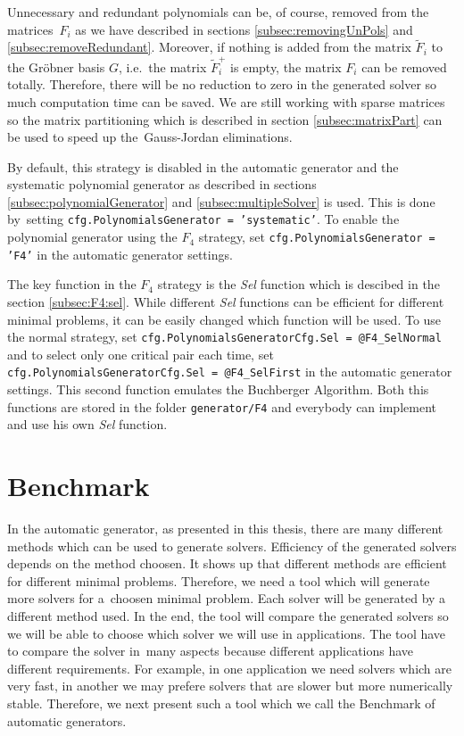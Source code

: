 Unnecessary and redundant polynomials can be, of course, removed from the matrices~$F_i$ as we have described in sections \ref{subsec:removingUnPols} and \ref{subsec:removeRedundant}. Moreover, if nothing is added from the matrix $\tilde{F}_i$ to the Gr\"obner basis $G$, i.e.\ the matrix $\tilde{F}_i^+$ is empty, the matrix $F_i$ can be removed totally. Therefore, there will be no reduction to zero in the generated solver so much computation time can be saved. We are still working with sparse matrices so the matrix partitioning which is described in section \ref{subsec:matrixPart} can be used to speed up the~Gauss-Jordan eliminations.

By default, this strategy is disabled in the automatic generator and the systematic polynomial generator as described in sections \ref{subsec:polynomialGenerator} and \ref{subsec:multipleSolver} is used. This is done by~setting \texttt{cfg.PolynomialsGenerator = 'systematic'}. To enable the polynomial generator using the $F_4$ strategy, set \texttt{cfg.PolynomialsGenerator = 'F4'} in the automatic generator settings.

The key function in the $F_4$ strategy is the \textit{Sel} function which is descibed in the section \ref{subsec:F4:sel}. While different \textit{Sel} functions can be efficient for different minimal problems, it can be easily changed which function will be used. To use the normal strategy, set \texttt{cfg.PolynomialsGeneratorCfg.Sel = @F4\_SelNormal} and to select only one critical pair each time, set \texttt{cfg.PolynomialsGeneratorCfg.Sel = @F4\_SelFirst} in the automatic generator settings. This second function emulates the Buchberger Algorithm. Both this functions are stored in the folder \texttt{generator/F4} and everybody can implement and use his own \textit{Sel} function.

\section{Benchmark}
In the automatic generator, as presented in this thesis, there are many different methods which can be used to generate solvers. Efficiency of the generated solvers depends on the method choosen. It shows up that different methods are efficient for different minimal problems. Therefore, we need a tool which will generate more solvers for a~choosen minimal problem. Each solver will be generated by a different method used. In the end, the tool will compare the generated solvers so we will be able to choose which solver we will use in applications. The tool have to compare the solver in~many aspects because different applications have different requirements. For example, in one application we need solvers which are very fast, in another we may prefere solvers that are slower but more numerically stable. Therefore, we next present such a tool which we call the Benchmark of automatic generators.

